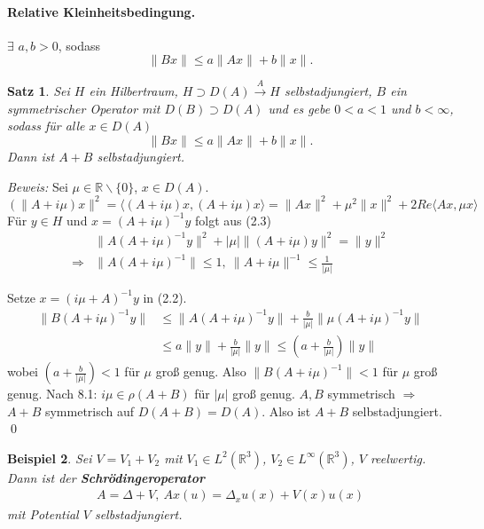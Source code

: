 \documentclass[12pt]{extreport} %
\newtheorem{Satz}{Satz}[subsection]
\newtheorem{Beispiel}[Satz]{Beispiel}
\numberwithin{equation}{section}
\newcommand{\R}{\mathbb{R}} %
\newcommand{\Bew}{\emph{Beweis: }}
\newcommand{\laplace}{\Delta}
\begin{document}
	\paragraph{Relative Kleinheitsbedingung.} $\exists$ $a,b>0$, sodass 
	$$\|Bx\| \leq a\|Ax\| + b\|x\|.$$
	
	\begin{Satz}
		Sei $H$ ein Hilbertraum, $H\supset D(A)\overset{A}{\rightarrow} H$ selbstadjungiert, $B$ ein symmetrischer Operator mit $D(B)\supset D(A)$ und es gebe $0<a<1$ und $b<\infty$, sodass für alle $x\in D(A)$
		\begin{equation}
			\|Bx\| \leq a\|Ax\| + b\|x\|.
		\end{equation}
		Dann ist $A+B$ selbstadjungiert.
	\end{Satz}
	
	\Bew Sei $\mu\in \R\backslash\{0\}$, $x\in D(A)$. 
	\begin{equation}
		(\|A+i\mu)x\|^2 = \langle (A+i\mu)x, (A+i\mu)x\rangle = \|Ax\|^2 + \mu^2\|x\|^2 + 2 Re\langle Ax,\mu x\rangle
	\end{equation}
	Für $y\in H$ und $x=(A+i\mu)^{-1}y$ folgt aus (2.3) 
	\begin{align*}
		&\|A(A+i\mu)^{-1}y\|^2 + |\mu| \|(A+i\mu)y\|^2 = \|y\|^2\\
		\Rightarrow& \|A(A+i\mu)^{-1} \|\leq 1,~ \|A+i\mu\|^{-1}\leq \frac{1}{|\mu|}
	\end{align*}
	
	Setze $x=(i\mu + A)^{-1}y$ in (2.2).
	\begin{align*}
		\|B(A + i\mu)^{-1}y\| &\leq \|A(A+i\mu)^{-1}y\| + \frac{b}{|\mu|}\|\mu (A+i\mu)^{-1}y\|\\
		&\leq a \|y\| + \frac{b}{|\mu|}\|y\|\leq (a+\frac{b}{|\mu|})\|y\|
	\end{align*}
	wobei $(a+\frac{b}{|\mu|})<1$ für $\mu$ groß genug. Also $\|B(A+i\mu)^{-1}\|<1$ für $\mu$ groß genug. Nach 8.1: $i\mu\in \rho(A+B)$ für $|\mu|$ groß genug. $A,B$ symmetrisch $\Rightarrow$ $A+B$ symmetrisch auf $D(A+B)= D(A)$. Also ist $A+B$ selbstadjungiert.
	\qed
	
	\begin{Beispiel}
		Sei $V = V_1+V_2$ mit $V_1\in L^2(\R^3)$, $V_2\in L^{\infty}(\R^3)$, $V$ reelwertig. Dann ist der \textbf{Schrödingeroperator} 
		\begin{align*}
			A = \laplace + V,~ Ax(u) = \laplace_x u(x) + V(x) u(x)
		\end{align*}
		mit Potential $V$ selbstadjungiert.
	\end{Beispiel}
	
\end{document}
